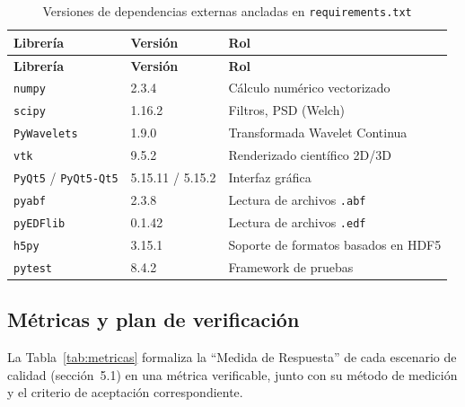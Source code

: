 \documentclass[11pt,a4paper]{article}
\DeclareRobustCommand{\_}{\textunderscore\allowbreak}
\begin{document}
\begin{center}
\small
\begin{longtable}{|p{}|p{}|p{}|}
\caption{Versiones de dependencias externas ancladas en \texttt{requirements.txt}} \label{tab:deps} \\
\hline
\textbf{Librer\'ia} & \textbf{Versi\'on} & \textbf{Rol} \\
\hline
\endfirsthead
\hline
\textbf{Librer\'ia} & \textbf{Versi\'on} & \textbf{Rol} \\
\hline
\endhead
\texttt{numpy} & 2.3.4 & C\'alculo num\'erico vectorizado \\
\hline
\texttt{scipy} & 1.16.2 & Filtros, PSD (Welch) \\
\hline
\texttt{PyWavelets} & 1.9.0 & Transformada Wavelet Continua \\
\hline
\texttt{vtk} & 9.5.2 & Renderizado cient\'ifico 2D/3D \\
\hline
\texttt{PyQt5} / \texttt{PyQt5-Qt5} & 5.15.11 / 5.15.2 & Interfaz gr\'afica \\
\hline
\texttt{pyabf} & 2.3.8 & Lectura de archivos \texttt{.abf} \\
\hline
\texttt{pyEDFlib} & 0.1.42 & Lectura de archivos \texttt{.edf} \\
\hline
\texttt{h5py} & 3.15.1 & Soporte de formatos basados en HDF5 \\
\hline
\texttt{pytest} & 8.4.2 & Framework de pruebas \\
\hline
\end{longtable}
\end{center}

\subsection{M\'etricas y plan de verificaci\'on}
\label{sec:metricas_verificacion}

La Tabla~\ref{tab:metricas} formaliza la ``Medida de Respuesta'' de cada escenario de calidad (secci\'on~5.1) en una m\'etrica verificable, junto con su m\'etodo de medici\'on y el criterio de aceptaci\'on correspondiente.
\end{document}
